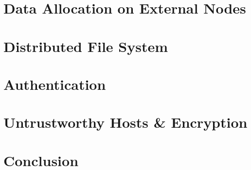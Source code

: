 \documentclass[a4paper,10pt]{article}
\begin{document}
\section{Data Allocation on External Nodes}

\section{Distributed File System}

\section{Authentication}
%

\section{Untrustworthy Hosts \& Encryption}
%

\section{Conclusion}
%



\end{document}
